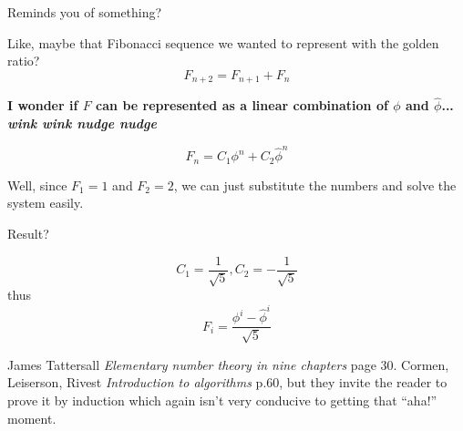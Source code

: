 \documentclass{article}
\begin{document}
Reminds you of something?

Like, maybe that Fibonacci sequence we wanted to represent with the golden ratio? $$F_{n+2} = F_{n+1} + F_{n}$$

\textbf{I wonder if $F$ can be represented as a linear combination of $\phi$ and $\hat{\phi}$... \textit{wink wink nudge nudge}}

$$F_n = C_1 \phi^n + C_2 \hat\phi^n$$

Well, since $F_1 = 1$ and $F_2 = 2$, we can just substitute the numbers and solve the system easily.

Result?

$$C_1 = \frac{1}{\sqrt{5}}, C_2 = -\frac{1}{\sqrt{5}}$$
thus
$$F_i = \frac {\phi^i - \hat{\phi}^i}{\sqrt{5}}$$

\begin{thebibliography}{1}

 James Tattersall {\em Elementary number theory in nine chapters} page 30.
 Cormen, Leiserson, Rivest {\em Introduction to algorithms} p.60, but they invite the reader to prove it by induction which again isn't very conducive to getting that ``aha!'' moment.

\end{thebibliography}
\end{document}
